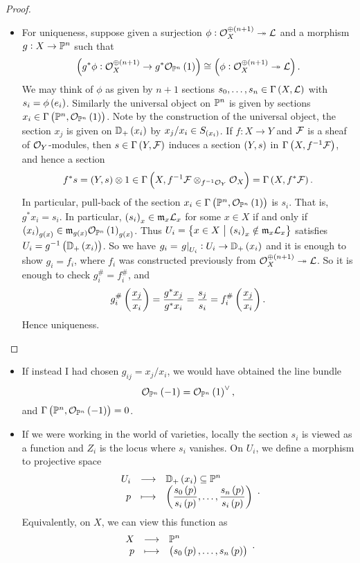 \begin{proof}
\begin{itemize}
\item For uniqueness, suppose given a surjection $ \phi : \OOO_X^{\oplus \br{n + 1}} \twoheadrightarrow \LLL $ and a morphism $ g : X \to \mathbb{P}^n $ such that
$$ \br{g^*\phi : \OOO_X^{\oplus \br{n + 1}} \to g^*\OOO_{\PP^n}\br{1}} \cong \br{\phi : \OOO_X^{\oplus \br{n + 1}} \twoheadrightarrow \LLL}. $$
We may think of $ \phi $ as given by $ n + 1 $ sections $ s_0, \dots, s_n \in \Gamma\br{X, \LLL} $ with $ s_i = \phi\br{e_i} $. Similarly the universal object on $ \mathbb{P}^n $ is given by sections $ x_i \in \Gamma\br{\PP^n, \OOO_{\PP^n}\br{1}} $. Note by the construction of the universal object, the section $ x_j $ is given on $ \DD_+\br{x_i} $ by $ x_j / x_i \in S_{\br{x_i}} $. If $ f : X \to Y $ and $ \mathcal{F} $ is a sheaf of $ \mathcal{O}_Y $-modules, then $ s \in \Gamma\br{Y, \FFF} $ induces a section $ \br{Y, s} $ in $ \Gamma\br{X, f^{-1}\FFF} $, and hence a section
$$ f^*s = \br{Y, s} \otimes 1 \in \Gamma\br{X, f^{-1}\FFF \otimes_{f^{-1}\OOO_Y} \OOO_X} = \Gamma\br{X, f^*\FFF}. $$
In particular, pull-back of the section $ x_i \in \Gamma\br{\PP^n, \OOO_{\PP^n}\br{1}} $ is $ s_i $. That is, $ g^*x_i = s_i $. In particular, $ \br{s_i}_x \in \mmm_x\LLL_x $ for some $ x \in X $ if and only if $ \br{x_i}_{g\br{x}} \in \mmm_{g\br{x}}\OOO_{\PP^n}\br{1}_{g\br{x}} $. Thus $ U_i = \cbr{x \in X \st \br{s_i}_x \notin \mmm_x\LLL_x} $ satisfies $ U_i = g^{-1}\br{\DD_+\br{x_i}} $. So we have $ g_i = \eval{g}_{U_i} : U_i \to \DD_+\br{x_i} $ and it is enough to show $ g_i = f_i $, where $ f_i $ was constructed previously from $ \OOO_X^{\oplus \br{n + 1}} \twoheadrightarrow \LLL $. So it is enough to check $ g_i^\# = f_i^\# $, and
$$ g_i^\#\br{\dfrac{x_j}{x_i}} = \dfrac{g^*x_j}{g^*x_i} = \dfrac{s_j}{s_i} = f_i^\#\br{\dfrac{x_j}{x_i}}. $$
Hence uniqueness.
\end{itemize}
\end{proof}

\begin{remark*}
\hfill
\begin{itemize}
\item If instead I had chosen $ g_{ij} = x_j / x_i $, we would have obtained the line bundle
$$ \OOO_{\PP^n}\br{-1} = \OOO_{\PP^n}\br{1}^\vee, $$
and $ \Gamma\br{\PP^n, \OOO_{\PP^n}\br{-1}} = 0 $.
\item If we were working in the world of varieties, locally the section $ s_i $ is viewed as a function and $ Z_i $ is the locus where $ s_i $ vanishes. On $ U_i $, we define a morphism to projective space
$$ \function{U_i}{\DD_+\br{x_i} \subseteq \PP^n}{p}{\br{\dfrac{s_0\br{p}}{s_i\br{p}}, \dots, \dfrac{s_n\br{p}}{s_i\br{p}}}}. $$
Equivalently, on $ X $, we can view this function as
$$ \function{X}{\PP^n}{p}{\br{s_0\br{p}, \dots, s_n\br{p}}}. $$
\end{itemize}
\end{remark*}

